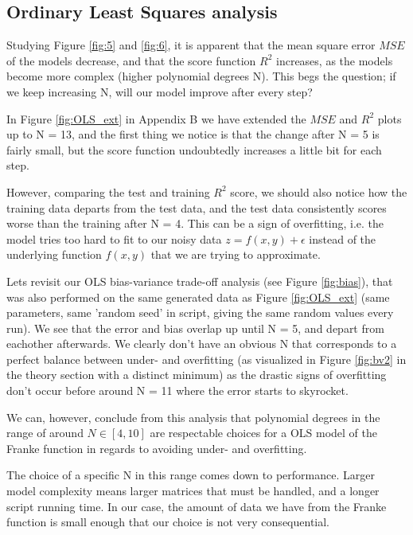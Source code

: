 \documentclass[reprint,english,notitlepage]{revtex4-1}  %
\begin{document}
\subsection{Ordinary Least Squares analysis}

Studying Figure \ref{fig:5} and \ref{fig:6}, it is apparent that the mean square error $MSE$ of the models decrease, and that the score function $R^2$ increases, as the models become more complex (higher polynomial degrees N). This begs the question; if we keep increasing N, will our model improve after every step?

In Figure \ref{fig:OLS_ext} in Appendix B we have extended the $MSE$ and $R^2$ plots up to N = 13, and the first thing we notice is that the change after N = 5 is fairly small, but the score function undoubtedly increases a little bit for each step.

However, comparing the test and training $R^2$ score, we should also notice how the training data departs from the test data, and the test data consistently scores worse than the training after N = 4. This can be a sign of overfitting, i.e. the model tries too hard to fit to our noisy data $z = f(x,y) + \epsilon$ instead of the underlying function $f(x, y)$ that we are trying to approximate.

Lets revisit our OLS bias-variance trade-off analysis (see Figure \ref{fig:bias}), that was also performed on the same generated data as Figure \ref{fig:OLS_ext} (same parameters, same 'random seed' in script, giving the same random values every run). We see that the error and bias overlap up until N = 5, and depart from eachother afterwards. We clearly don't have an obvious N that corresponds to a perfect balance between under- and overfitting (as visualized in Figure \ref{fig:bv2} in the theory section with a distinct minimum) as the drastic signs of overfitting don't occur before around N = 11 where the error starts to skyrocket.

We can, however, conclude from this analysis that polynomial degrees in the range of around $N \in [4, 10]$ are respectable choices for a OLS model of the Franke function in regards to avoiding under- and overfitting.

The choice of a specific N in this range comes down to performance. Larger model complexity means larger matrices that must be handled, and a longer script running time. In our case, the amount of data we have from the Franke function is small enough that our choice is not very consequential.
\end{document}
